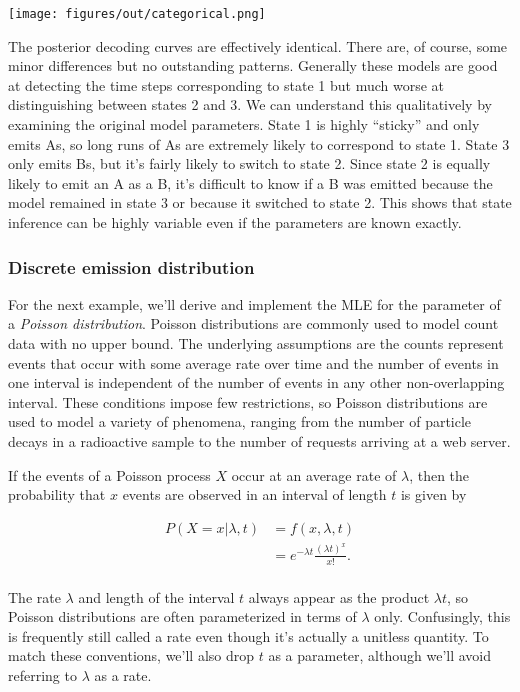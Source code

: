 \begin{NotebookImage}
\texttt{[image: figures/out/categorical.png]}
\end{NotebookImage}

The posterior decoding curves are effectively identical. There are, of course, some minor differences but no outstanding patterns. Generally these models are good at detecting the time steps corresponding to state 1 but much worse at distinguishing between states 2 and 3. We can understand this qualitatively by examining the original model parameters. State 1 is highly ``sticky'' and only emits As, so long runs of As are extremely likely to correspond to state 1. State 3 only emits Bs, but it's fairly likely to switch to state 2. Since state 2 is equally likely to emit an A as a B, it's difficult to know if a B was emitted because the model remained in state 3 or because it switched to state 2. This shows that state inference can be highly variable even if the parameters are known exactly.

\subsubsection{Discrete emission distribution}

For the next example, we'll derive and implement the MLE for the parameter of a \textit{Poisson distribution}. Poisson distributions are commonly used to model count data with no upper bound. The underlying assumptions are the counts represent events that occur with some average rate over time and the number of events in one interval is independent of the number of events in any other non-overlapping interval. These conditions impose few restrictions, so Poisson distributions are used to model a variety of phenomena, ranging from the number of particle decays in a radioactive sample to the number of requests arriving at a web server.

If the events of a Poisson process $X$ occur at an average rate of $\lambda$, then the probability that $x$ events are observed in an interval of length $t$ is given by

\begin{align*}
P(X = x | \lambda, t)
&= f(x, \lambda, t) \\
&= e^{-\lambda t} \frac{(\lambda t)^x}{x!}. \\
\end{align*}

The rate $\lambda$ and length of the interval $t$ always appear as the product $\lambda t$, so Poisson distributions are often parameterized in terms of $\lambda$ only. Confusingly, this is frequently still called a rate even though it's actually a unitless quantity. To match these conventions, we'll also drop $t$ as a parameter, although we'll avoid referring to $\lambda$ as a rate.

